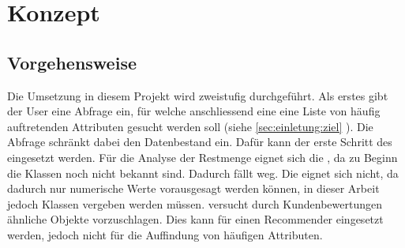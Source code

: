 
\chapter{Konzept}
\label{sec:konzept}

\section{Vorgehensweise}
\label{sec:konzept:vorgehensweise}
Die Umsetzung in diesem Projekt wird zweistufig durchgeführt. Als erstes gibt der User eine Abfrage ein, für welche anschliessend eine eine Liste von häufig auftretenden Attributen gesucht werden soll (siehe \cref{sec:einletung:ziel} ). Die Abfrage schränkt dabei den Datenbestand ein. Dafür kann der erste Schritt des  eingesetzt werden. Für die Analyse der Restmenge eignet sich die , da zu Beginn die Klassen noch nicht bekannt sind. Dadurch fällt  weg. Die  eignet sich nicht, da dadurch nur numerische Werte vorausgesagt werden können, in dieser Arbeit jedoch Klassen vergeben werden müssen.  versucht durch Kundenbewertungen ähnliche Objekte vorzuschlagen. Dies kann für einen Recommender eingesetzt werden, jedoch nicht für die Auffindung von häufigen Attributen.

